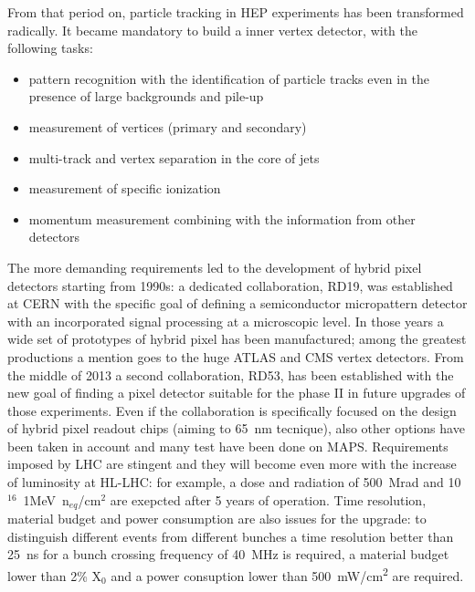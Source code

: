     From that period on, particle tracking in HEP experiments has been transformed radically. It became mandatory to build a inner vertex detector, with the following tasks:
    \begin{itemize}
        \item pattern recognition with the identification of particle tracks even in the presence of large backgrounds and pile-up
        \item measurement of vertices (primary and secondary)
        \item multi-track and vertex separation in the core of jets
        \item measurement of specific ionization
        \item momentum measurement combining with the information from other detectors 
    \end{itemize}

    The more demanding requirements led to the development of hybrid pixel detectors starting from 1990s: a dedicated collaboration, RD19, was established at CERN with the specific goal of defining a semiconductor micropattern detector with an incorporated signal processing at a microscopic level. 
    In those years a wide set of prototypes of hybrid pixel has been manufactured; among the greatest productions a mention goes to the huge ATLAS and CMS vertex detectors. 
    From the middle of 2013 a second collaboration, RD53, has been established with the new goal of finding a pixel detector suitable for the phase II in future upgrades of those experiments. Even if the collaboration is specifically focused on the design of hybrid pixel readout chips (aiming to \SI{65}{nm} tecnique), also other options have been taken in account and many test have been done on MAPS. Requirements imposed by LHC are stingent and they will become even more with the increase of luminosity at HL-LHC: for example, a dose and radiation of \SI{500}{Mrad} and 10$^{16}$~1MeV~n$_{eq}$/cm$^2$ are exepcted after 5 years of operation. Time resolution, material budget and power consumption are also issues for the upgrade: to distinguish different events from different bunches a time resolution better than \SI{25}{ns} for a bunch crossing frequency of \SI{40}{MHz} is required, a material budget lower than 2\% X$_0$ and a power consuption lower than \SI{500}{mW/cm\squared} are required. 


